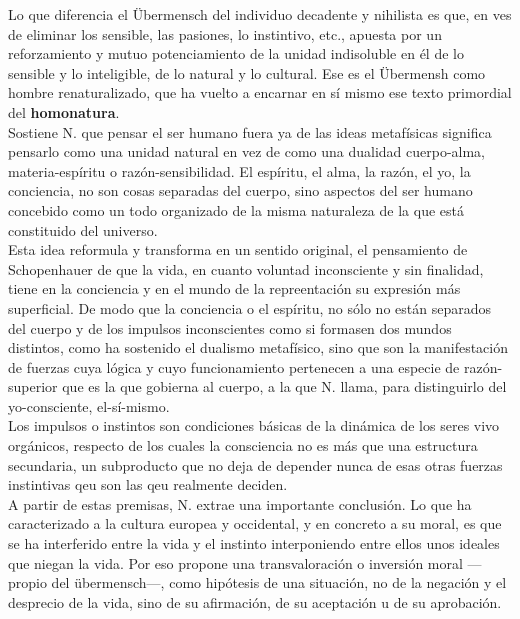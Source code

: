 \documentclass[a4paper, 10pt, twocolumn, spanish]{article}
\begin{document}
Lo que diferencia el Übermensch del individuo decadente y nihilista es
que, en ves de eliminar los sensible, las pasiones, lo instintivo,
etc., apuesta por un reforzamiento y mutuo potenciamiento de la unidad
indisoluble en él de lo sensible y lo inteligible, de lo natural y lo
cultural. Ese es el Übermensh como hombre renaturalizado, que ha
vuelto a encarnar en sí mismo ese texto primordial del \textbf{homonatura}.\\[0pt]

Sostiene N. que pensar el ser humano fuera ya de las ideas metafísicas
significa pensarlo como una unidad natural en vez de como una dualidad
cuerpo-alma, materia-espíritu o razón-sensibilidad. El espíritu, el
alma, la razón, el yo, la conciencia, no son cosas separadas del
cuerpo, sino aspectos del ser humano concebido como un todo organizado
de la misma naturaleza de la que está constituido del universo.\\[0pt]
Esta idea reformula y transforma en un sentido original, el
pensamiento de Schopenhauer de que la vida, en cuanto voluntad
inconsciente y sin finalidad, tiene en la conciencia y en el mundo de
la repreentación su expresión más superficial.  De modo que la
conciencia o el espíritu, no sólo no están separados del cuerpo y de
los impulsos inconscientes como si formasen dos mundos distintos, como
ha sostenido el dualismo metafísico, sino que son la manifestación de
fuerzas cuya lógica y cuyo funcionamiento pertenecen a una especie de
razón-superior que es la que gobierna al cuerpo, a la que N. llama,
para distinguirlo del yo-consciente, el-sí-mismo.\\[0pt]

Los impulsos o instintos son condiciones básicas de la dinámica de los
seres vivo orgánicos, respecto de los cuales la consciencia no es más
que una estructura secundaria, un subproducto que no deja de depender
nunca de esas otras fuerzas instintivas qeu son las qeu realmente
deciden.\\[0pt]

A partir de estas premisas, N. extrae una importante conclusión. Lo
que ha caracterizado a la cultura europea y occidental, y en concreto
a su moral, es que se ha interferido entre la vida y el instinto
interponiendo entre ellos unos ideales que niegan la vida. Por eso
propone una transvaloración o inversión moral —propio del übermensch—,
como hipótesis de una situación, no de la negación y el desprecio de
la vida, sino de su afirmación, de su aceptación u de su aprobación.\\[0pt]
\end{document}
